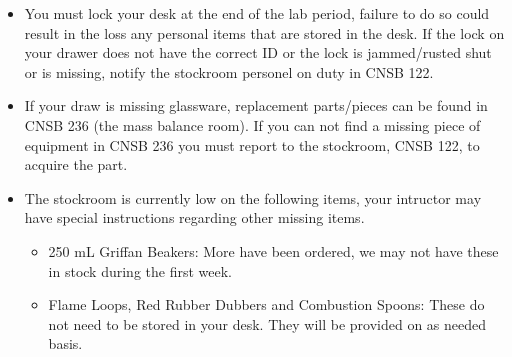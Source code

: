 \documentclass[11pt]{article}
\begin{document}
\begin{itemize}
\item You must lock your desk at the end of the lab period, failure to do so could result in the loss any personal items that are stored in the desk. If the lock on your drawer does not have the correct ID or the lock is jammed/rusted shut or is missing, notify the stockroom personel on duty in CNSB 122.
\item If your draw is missing glassware, replacement parts/pieces can be found in CNSB 236 (the mass balance room). If you can not find a missing piece of equipment in CNSB 236 you must report to the stockroom, CNSB 122, to acquire the part.
\item The stockroom is currently low on the following items, your intructor may have special instructions regarding other missing items.
\begin{itemize}
\item 250 mL Griffan Beakers: More have been ordered, we may not have these in stock during the first week.
\item Flame Loops, Red Rubber Dubbers and Combustion Spoons: These do not need to be stored in your desk. They will be provided on as needed basis.
\end{itemize}
\end{itemize}
\end{document}
